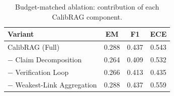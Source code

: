 \begin{table}
\caption{Budget-matched ablation: contribution of each CalibRAG component.}
\label{tab:ablation_results}
\begin{tabular}{lccc}
\toprule
Variant & EM & F1 & ECE \\
\midrule
CalibRAG (Full) & 0.288 & 0.437 & 0.543 \\
− Claim Decomposition & 0.264 & 0.409 & 0.532 \\
− Verification Loop & 0.266 & 0.413 & 0.435 \\
− Weakest-Link Aggregation & 0.288 & 0.437 & 0.559 \\
\bottomrule
\end{tabular}
\end{table}
